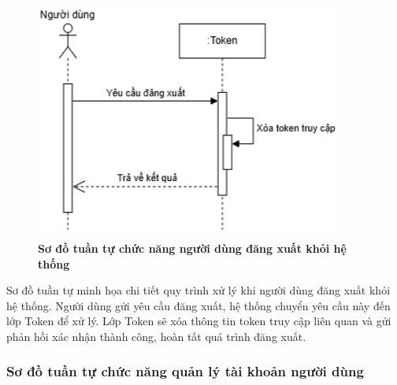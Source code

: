 \begin{figure}[H]
	\centering
	\includegraphics[width=10cm,height=8cm]{Images/sequence/user/logout.drawio.png}
	\caption[Sơ đồ tuần tự chức năng người dùng đăng xuất khỏi hệ thống]{\bfseries \fontsize{12pt}{0pt}
		\selectfont Sơ đồ tuần tự chức năng người dùng đăng xuất khỏi hệ thống}
	\label{sequence_logout} %
\end{figure}
Sơ đồ tuần tự minh họa chi tiết quy trình xử lý khi người dùng đăng xuất khỏi hệ thống. Người dùng gửi yêu cầu đăng xuất, hệ thống chuyển yêu cầu này đến lớp Token để xử lý.
Lớp Token sẽ xóa thông tin token truy cập liên quan và gửi phản hồi xác nhận thành công, hoàn tất quá trình đăng xuất.

\subsubsection{Sơ đồ tuần tự chức năng quản lý tài khoản người dùng}

